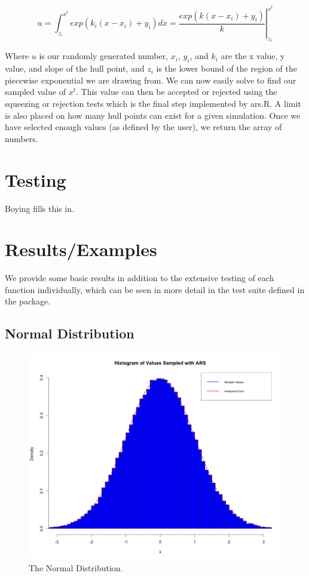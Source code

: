 \documentclass[12pt, oneside]{article}
\begin{document}
\[ u = \int_{z_i}^{x^t} exp(k_i (x - x_i) + y_i) dx = \left. \frac{exp(k (x - x_i )+ y_i)}{k} \right|_{z_i}^{x^t} \] 

Where \(u\) is our randomly generated number, \(x_i\), \(y_i\), and \(k_i\) are the x value, y value, and slope of the hull point, and \(z_i\) is the lower bound of the region of the piecewise exponential we are drawing from.  We can now easily solve to find our sampled value of \(x^t\).  This value can then be accepted or rejected using the squeezing or rejection tests which is the final step implemented by ars.R.    A limit is also placed on how many hull points can exist for a given simulation.  Once we have selected enough values (as defined by the user), we return the array of numbers.

\section{Testing}

Boying fills this in.

\section{Results/Examples}

We provide some basic results in addition to the extensive testing of each function individually, which can be seen in more detail in the test suite defined in the package.

\subsection{Normal Distribution}

\begin{figure}[H]
\centering
  \includegraphics[scale=.25]{figure/normal.jpeg}
  \caption{The Normal Distribution.}
  \label{fig:d1}
\end{figure}
\end{document}
